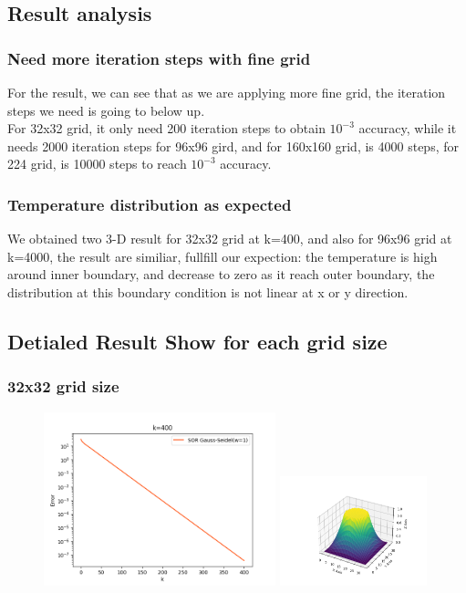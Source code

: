 \documentclass[12pt]{article}
\begin{document}
\subsection{Result analysis}

\subsubsection{Need more iteration steps with fine grid}
For the result, we can see that as we are applying more fine grid,
the iteration steps we need is going to below up.\\

For 32x32 grid, it only need 200 iteration steps to obtain $10^{-3}$
accuracy, while it needs 2000 iteration steps for 96x96 gird,
and for 160x160 grid, is 4000 steps, for 224 grid, is 10000 steps to
reach $10^{-3}$ accuracy.

\subsubsection{Temperature distribution as expected}
We obtained two 3-D result for 32x32 grid at k=400, and also
for 96x96 grid at k=4000, the result are similiar,  fullfill
our expection: the temperature is high around inner boundary, and decrease
to zero as it reach outer boundary, the  distribution at this boundary 
condition is not linear at x or y direction.




\subsection{Detialed Result Show for each grid size}

\subsubsection{32x32 grid size}


\begin{figure}[H]
    \centering
    \includegraphics[width=0.6\textwidth]{aP=32.png}
    \includegraphics[width=0.38\textwidth]{32X32show.png}
    \label{aP=32.png}
\end{figure}
\end{document}
